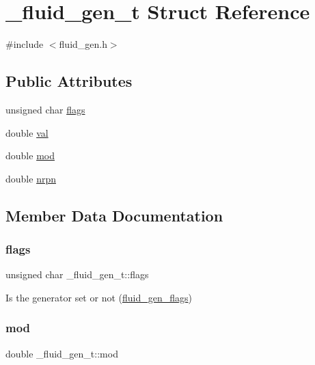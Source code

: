 \hypertarget{struct__fluid__gen__t}{}\section{\+\_\+fluid\+\_\+gen\+\_\+t Struct Reference}
\label{struct__fluid__gen__t}


{\ttfamily \#include $<$fluid\+\_\+gen.\+h$>$}

\subsection*{Public Attributes}
\begin{DoxyCompactItemize}
\item 
unsigned char \hyperlink{struct__fluid__gen__t_a7cac8ba849dbf3d0d475bc4824cd406c}{flags}
\item 
double \hyperlink{struct__fluid__gen__t_a966264ce25b249592931cc0a4d34fe1d}{val}
\item 
double \hyperlink{struct__fluid__gen__t_a19ffa472a4f6f1f7cb83359a7105c37e}{mod}
\item 
double \hyperlink{struct__fluid__gen__t_a27422db6e42b16281b11ebe2faf7bc97}{nrpn}
\end{DoxyCompactItemize}


\subsection{Member Data Documentation}
\mbox{\label{struct__fluid__gen__t_a7cac8ba849dbf3d0d475bc4824cd406c}} 
\subsubsection{\texorpdfstring{flags}{flags}}
{\footnotesize\ttfamily unsigned char \+\_\+fluid\+\_\+gen\+\_\+t\+::flags}

Is the generator set or not (\hyperlink{fluid__gen_8h_a96f1389ca9e52d85cdf1160a038b4bb5}{fluid\+\_\+gen\+\_\+flags}) \mbox{\label{struct__fluid__gen__t_a19ffa472a4f6f1f7cb83359a7105c37e}} 
\subsubsection{\texorpdfstring{mod}{mod}}
{\footnotesize\ttfamily double \+\_\+fluid\+\_\+gen\+\_\+t\+::mod}


